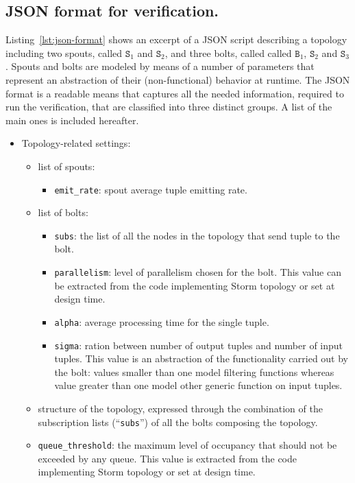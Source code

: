 \documentclass[smallextended]{svjour3}       %
\begin{document}
{\color{blue}
\subsection{JSON format for verification.}
Listing~\ref{lst:json-format} shows an excerpt of a JSON script describing a topology including two spouts, called $\mathtt{S}_1$ and $\mathtt{S}_2$, and three bolts, called called $\mathtt{B}_1$, $\mathtt{S}_2$ and $\mathtt{S}_3$.
Spouts and bolts are modeled by means of a number of parameters that represent an abstraction of their (non-functional) behavior at runtime.
The JSON format is a readable means that captures all the needed information,  required to run the verification, that are classified into three distinct groups.
A list of the main ones is included hereafter.
\begin{itemize}
	\item Topology-related settings:
	\begin{itemize}
		\item list of spouts:
		\begin{itemize}
			\item \texttt{emit\_rate}: spout average tuple emitting rate.
		\end{itemize}
		\item list of bolts:
		\begin{itemize}
			\item \texttt{subs}: the list of all the nodes in the topology that send tuple to the bolt.
			\item \texttt{parallelism}: level of parallelism chosen for the bolt. This value can be extracted from the code implementing Storm topology or set at design time.
			\item \texttt{alpha}: average processing time for the single tuple.
			\item \texttt{sigma}: ration between number of output tuples and number of input tuples. This value is an abstraction of the functionality carried out by the bolt: values smaller than one model filtering functions whereas value greater than one model other generic function on input tuples.
		\end{itemize}
		\item structure of the topology, expressed through the combination of the subscription lists (``\texttt{subs}'') of all the bolts composing the topology.
		\item \texttt{queue\_threshold}: the maximum level of occupancy that should not be exceeded by any queue. This value is extracted from the code implementing Storm topology or set at design time.

\end{itemize}
\end{itemize}}
\end{document}
